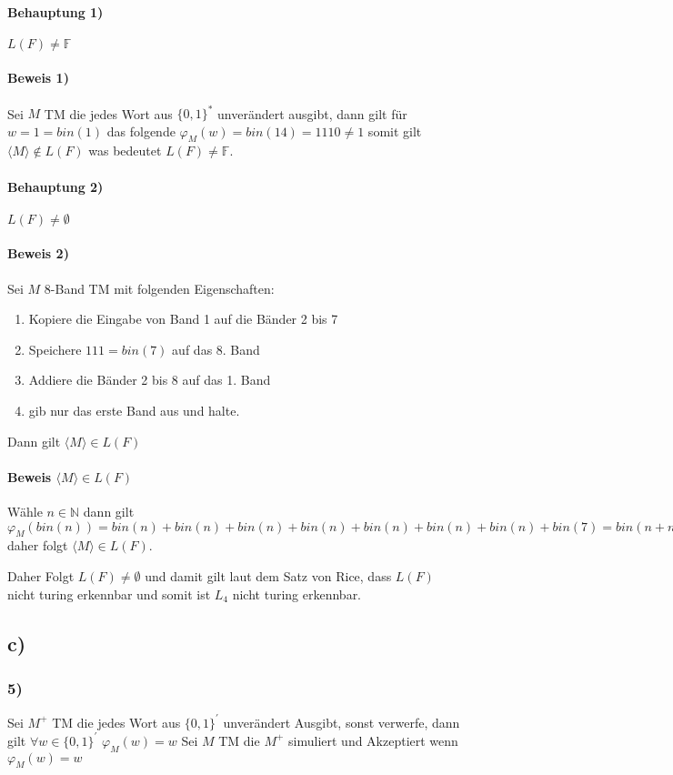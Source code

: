 \paragraph*{Behauptung 1)}
$L(F) \neq \mathbb{F}$

\paragraph*{Beweis 1)}
Sei $M$ TM die jedes Wort aus $\{0,1\}^*$ unverändert ausgibt, dann gilt für $w=1=bin(1)$ das folgende $\varphi_M(w)=bin(14)=1110 \neq 1$ somit gilt $\langle M \rangle \notin L(F)$ was bedeutet $L(F) \neq \mathbb{F}$.

\paragraph*{Behauptung 2)}
$L(F) \neq \emptyset$
\paragraph*{Beweis 2)}
Sei $M$ 8-Band TM mit folgenden Eigenschaften:
\begin{enumerate}
\item Kopiere die Eingabe von Band 1 auf die Bänder 2 bis 7
\item Speichere $111=bin(7)$ auf das 8. Band
\item Addiere die Bänder 2 bis 8 auf das 1. Band 
\item gib nur das erste Band aus und halte.
\end{enumerate}
Dann gilt $\langle M \rangle \in L(F) $
\paragraph*{Beweis $\langle M \rangle \in L(F) $}
Wähle $n \in \mathbb{N}$ dann gilt $\varphi_M(bin(n))=bin(n)+bin(n)+bin(n)+bin(n)+bin(n)+bin(n)+bin(n)+bin(7)=bin(n+n+n+n+n+n+n+7)=bin(7*n+7)$ daher folgt $\langle M \rangle \in L(F) $.

Daher Folgt $L(F) \neq \emptyset$ und damit gilt laut dem Satz von Rice, dass $L(F)$ nicht turing erkennbar und somit ist $L_4$ nicht turing erkennbar.

\subsection*{c)}

\subsubsection*{5)}
Sei $M^+$ TM die jedes Wort aus $\{0,1\}^{\prime}$ unverändert Ausgibt, sonst verwerfe, dann gilt $\forall w \in \{0,1\}^{\prime}$ $\varphi_M(w)=w$ Sei $M$ TM die $M^+$ simuliert und Akzeptiert wenn $\varphi_M(w)=w$ 

